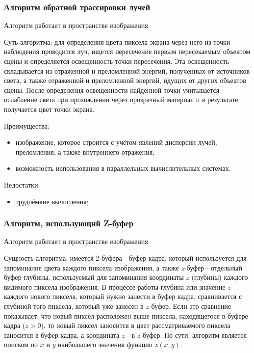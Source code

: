 \subsubsection{Алгоритм обратной трассировки лучей}
Алгоритм работает в пространстве изображения\cite{raytr}.

Суть алгоритма: для определения цвета пиксела экрана через него из точки наблюдения проводится луч,
ищется пересечение первым пересекаемым объектом сцены и определяется освещенность точки пересечения.
Эта освещенность складывается из отраженной и преломленной энергий, полученных от источников света,
а также отраженной и преломленной энергий, идущих от других объектов сцены.
После определения освещенности найденной точки учитывается ослабление света при прохождении через прозрачный материал
и в результате получается цвет точки экрана.

Преимущества:
\begin{itemize}
    \item изображение, которое строится с учётом явлений дисперсии лучей, преломления, а также внутреннего отражения;
    \item возможность использования в параллельных вычислительных системах.
\end{itemize}

Недостатки:
\begin{itemize}
    \item трудоёмкие вычисления\cite{tracer_proof};
\end{itemize}

\subsubsection{Алгоритм, использующий Z-буфер}
Алгоритм работает в пространстве изображения\cite{zbuf}.

Сущность алгоритма: имеется 2 буфера - буфер кадра, который используется для запоминания цвета каждого
пиксела изображения, а также $z$-буфер - отдельный буфер глубины,
используемый для запоминания координаты $z$ (глубины)
каждого видимого пиксела изображения.
В процессе работы глубина или значение $z$ каждого нового пиксела,
который нужно занести в буфер кадра, сравнивается с глубиной того пиксела,
который уже занесен в $z$-буфер.
Если это сравнение показывает, что новый пиксел расположен выше пиксела,
находящегося в буфере кадра ($z > 0$),
то новый пиксел заносится в цвет рассматриваемого пиксела заносится в буфер кадра, а координата $z$ - в $z$-буфер.
По сути, алгоритм является поиском по $x$ и $y$ наибольшего значения функции $z(x, y)$.

